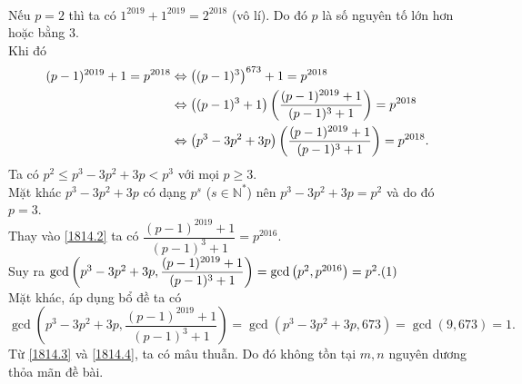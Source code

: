 \begin{ex}
{	\\ Nếu $p=2$ thì ta có $1^{2019}+1^{2019} =2^{2018}$ (vô lí). Do đó $p$ là số nguyên tố lớn hơn hoặc bằng $3$.
	\\ Khi đó \begin{align}
	(p-1)^{2019} + 1=p^{2018} &\Leftrightarrow \left( (p-1)^{3} \right) ^{673} +1 = p^{2018} \notag \\
	&\Leftrightarrow \left( (p-1)^3+ 1\right) \left( \dfrac{(p-1)^{2019} +1 }{(p-1)^3 +1}\right) =p^{2018} \notag \\
	&\Leftrightarrow  \left( p^3-3p^2+3p \right) \left( \dfrac{(p-1)^{2019} +1 }{(p-1)^3 +1}\right) =p^{2018}.\label{1814.2}
	\end{align}	
	Ta có $p^2 \leq p^3 -3p^2 +3p < p^3$ với mọi $ p \geq 3$. 
	\\Mặt khác $p^3-3p^2+3p$ có dạng $p^{s}$ ($s \in \mathbb{N}^{*}$) nên $p^3-3p^2+3p=p^2$ và do đó $p=3$.
	\\ Thay vào \eqref{1814.2} ta có $\dfrac{(p-1)^{2019} +1 }{(p-1)^3 +1} = p^{2016}$.
	\\ Suy ra $\gcd \left( p^3-3p^2+3p , \dfrac{(p-1)^{2019} +1 }{(p-1)^3 +1}\right) =\gcd \left( p^2, p^{2016}\right) =p^2. \refstepcounter{equation}\hfill (\theequation)\label{1814.3}$
	\\ Mặt khác, áp dụng bổ đề ta có 
	\begin{equation}\label{1814.4}
		\gcd \left( p^3-3p^2+3p , \dfrac{(p-1)^{2019} +1 }{(p-1)^3 +1}\right) =\gcd \left( p^3-3p^2+3p , 673\right)=\gcd (9,673)=1.  
	\end{equation}
	Từ \eqref{1814.3} và \eqref{1814.4}, ta có mâu thuẫn. Do đó không tồn tại $m,n$ nguyên dương thỏa mãn đề bài.
	}
\end{ex}

